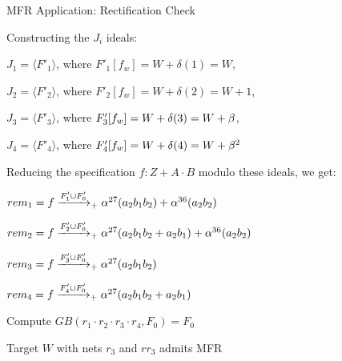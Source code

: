 \begin{frame}{\large MFR Application: Rectification Check}
\bi
	\item Constructing the $J_i$ ideals:
	\bi
		\item {\small$J_1 = \langle F'_1\rangle$, where $F'_1[f_w]=W+\delta(1)=W$},
		\item {\small$J_2 = \langle F'_2\rangle$, where $F'_2[f_w]=W+\delta(2)=W+1$},
		\item {\small$J_3 = \langle F'_3\rangle$, where $F'_3[f_w]=W+\delta(3)=W+\beta$},
		\item {\small$J_4 = \langle F'_4\rangle$, where $F'_4[f_w]=W+\delta(4)=W+\beta^2$}
	\ei
	\vspace{0.1in}
	\pause
	\item Reducing the specification $f: Z+A\cdot B$ modulo these ideals, we get:
\bi
\item $rem_1 = f \xrightarrow[]{F'_1\cup F'_{0}}_+{\alpha^{27} (a_2b_1b_2)+\alpha^{36} (a_2b_2)}$
\item $rem_2 = f \xrightarrow[]{F'_2\cup F'_{0}}_+{\alpha^{27} (a_2b_1b_2+a_2b_1)+\alpha^{36} (a_2b_2)}$
\item $rem_3 = f \xrightarrow[]{F'_3\cup F'_{0}}_+{\alpha^{27} (a_2b_1b_2)}$
\item $rem_4 = f \xrightarrow[]{F'_4\cup F'_{0}}_+{\alpha^{27} (a_2b_1b_2+a_2b_1)}$
\ei \pause
	\item Compute $GB(r_1\cdot r_2 \cdot r_3 \cdot r_4, F_0)=F_0$
	\item Target $W$ with nets $r_3$ and $rr_3$ admits MFR
\ei
\end{frame}





